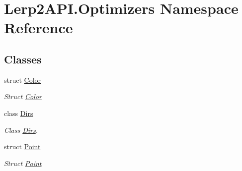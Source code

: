 \hypertarget{namespace_lerp2_a_p_i_1_1_optimizers}{}\section{Lerp2\+A\+P\+I.\+Optimizers Namespace Reference}
\label{namespace_lerp2_a_p_i_1_1_optimizers}
\subsection*{Classes}
\begin{DoxyCompactItemize}
\item 
struct \hyperlink{struct_lerp2_a_p_i_1_1_optimizers_1_1_color}{Color}
\begin{DoxyCompactList}\small\item\em Struct \hyperlink{struct_lerp2_a_p_i_1_1_optimizers_1_1_color}{Color} \end{DoxyCompactList}\item 
class \hyperlink{class_lerp2_a_p_i_1_1_optimizers_1_1_dirs}{Dirs}
\begin{DoxyCompactList}\small\item\em Class \hyperlink{class_lerp2_a_p_i_1_1_optimizers_1_1_dirs}{Dirs}. \end{DoxyCompactList}\item 
struct \hyperlink{struct_lerp2_a_p_i_1_1_optimizers_1_1_point}{Point}
\begin{DoxyCompactList}\small\item\em Struct \hyperlink{struct_lerp2_a_p_i_1_1_optimizers_1_1_point}{Point} \end{DoxyCompactList}\end{DoxyCompactItemize}

